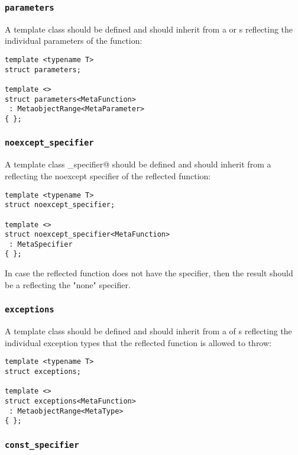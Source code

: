 \subsubsection{\texttt{parameters}}

A template class \verb@parameters@ should be defined and should inherit from
a  or s reflecting the individual parameters
of the function:

\begin{verbatim}
template <typename T>
struct parameters;

template <>
struct parameters<MetaFunction>
 : MetaobjectRange<MetaParameter>
{ };
\end{verbatim}

\subsubsection{\texttt{noexcept\_specifier}}

A template class \verb@noexcept_specifier@ should be defined and should inherit from
a  reflecting the noexcept specifier of the reflected function:

\begin{verbatim}
template <typename T>
struct noexcept_specifier;

template <>
struct noexcept_specifier<MetaFunction>
 : MetaSpecifier
{ };
\end{verbatim}

In case the reflected function does not have the \verb@noexcept@ specifier,
then the result should be a  reflecting the "none" specifier.

\subsubsection{\texttt{exceptions}}

A template class \verb@exceptions@ should be defined and should inherit from
a  of s reflecting the individual exception types
that the reflected function is allowed to throw:

\begin{verbatim}
template <typename T>
struct exceptions;

template <>
struct exceptions<MetaFunction>
 : MetaobjectRange<MetaType>
{ };
\end{verbatim}

\subsubsection{\texttt{const\_specifier}}

